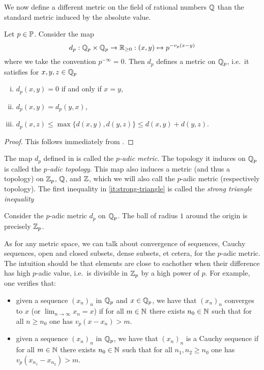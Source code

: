\documentclass[12pt, leqno, british]{amsart}
\begin{document}
We now define a different metric on the field of rational numbers $\mathbb Q$ than the standard metric induced by the absolute value.
\begin{prop}\label{P:p-adic-metric}
Let $p \in \mathbb P$.
Consider the map
$$ d_p : \mathbb Q_p \times \mathbb Q_p \to \mathbb R_{\geq 0} : (x, y) \mapsto p^{-v_p(x-y)}$$
where we take the convention $p^{-\infty} = 0$.
Then $d_p$ defines a metric on $\mathbb Q_p$, i.e.~it satisfies for $x, y, z \in \mathbb Q_p$
\begin{enumerate}[(i)]
\item $d_p(x, y) = 0$ if and only if $x = y$,
\item $d_p(x, y) = d_p(y, x)$,
\item\label{it:strong-triangle} $d_p(x, z) \leq \max \lbrace d(x, y), d(y, z) \rbrace \leq d(x, y) + d(y, z)$.
\end{enumerate}
\end{prop}
\begin{proof}
This follows immediately from .
\end{proof}
\begin{defi}
The map $d_p$ defined in  is called the \emph{$p$-adic metric}.
The topology it induces on $\mathbb Q_p$ is called the \emph{$p$-adic topology}.
This map also induces a metric (and thus a topology) on $\mathbb Z_p$, $\mathbb Q$, and $\mathbb Z$, which we will also call the $p$-adic metric (respectively topology).
The first inequality in \eqref{it:strong-triangle} is called the \emph{strong triangle inequality}
\end{defi}
\begin{eg}
Consider the $p$-adic metric $d_p$ on $\mathbb Q_p$. The ball of radius $1$ around the origin is precisely $\mathbb Z_p$.
\end{eg}
As for any metric space, we can talk about convergence of sequences, Cauchy sequences, open and closed subsets, dense subsets, et cetera, for the $p$-adic metric.
The intuition should be that elements are close to eachother when their difference has high $p$-adic value, i.e.~is divisible in $\mathbb Z_p$ by a high power of $p$.
For example, one verifies that:
\begin{itemize}
\item given a sequence $(x_n)_n$ in $\mathbb Q_p$ and $x \in \mathbb Q_p$, we have that $(x_n)_n$ converges to $x$ (or $\lim_{n \to \infty} x_n = x$) if for all $m \in \mathbb N$ there exists $n_0 \in \mathbb N$ such that for all $n \geq n_0$ one has $v_p(x - x_n) > m$.
\item given a sequence $(x_n)_n$ in $\mathbb Q_p$, we have that $(x_n)_n$ is a Cauchy sequence if for all $m \in \mathbb N$ there exists $n_0 \in \mathbb N$ such that for all $n_1, n_2 \geq n_0$ one has $v_p(x_{n_1} - x_{n_2}) > m$.
\end{itemize}
\end{document}
